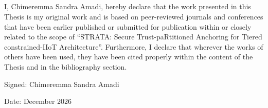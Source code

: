 \begin{titlepage}
\section*{\Huge{}}

\vspace{1cm}
\large

I, Chimeremma Sandra Amadi, hereby declare that the work presented in this Thesis is my original work and is based on peer-reviewed journals and conferences that have been earlier published or submitted for publication within or closely related to the scope of ``STRATA: Secure Trust-paRtitioned Anchoring for Tiered constrained-IIoT Architecture''. Furthermore, I declare that wherever the works of others have been used, they have been cited properly within the content of the Thesis and in the bibliography section.

\vspace{5.5cm} 

Signed: Chimeremma Sandra Amadi


Date: December 2026

\end{titlepage}